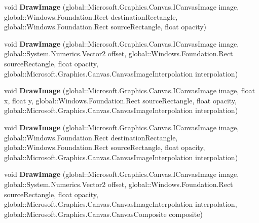 \begin{DoxyCompactItemize}
\item 
\mbox{\label{interface_microsoft_1_1_graphics_1_1_canvas_1_1_i_canvas_drawing_session_aa765d0fa935b76101e503c6434376586}} 
void {\bfseries Draw\+Image} (global\+::\+Microsoft.\+Graphics.\+Canvas.\+I\+Canvas\+Image image, global\+::\+Windows.\+Foundation.\+Rect destination\+Rectangle, global\+::\+Windows.\+Foundation.\+Rect source\+Rectangle, float opacity)
\item 
\mbox{\label{interface_microsoft_1_1_graphics_1_1_canvas_1_1_i_canvas_drawing_session_a9e068a61002b3491bc70ea21e2ee8517}} 
void {\bfseries Draw\+Image} (global\+::\+Microsoft.\+Graphics.\+Canvas.\+I\+Canvas\+Image image, global\+::\+System.\+Numerics.\+Vector2 offset, global\+::\+Windows.\+Foundation.\+Rect source\+Rectangle, float opacity, global\+::\+Microsoft.\+Graphics.\+Canvas.\+Canvas\+Image\+Interpolation interpolation)
\item 
\mbox{\label{interface_microsoft_1_1_graphics_1_1_canvas_1_1_i_canvas_drawing_session_aa7b11bec4901a474249edf660e7decd5}} 
void {\bfseries Draw\+Image} (global\+::\+Microsoft.\+Graphics.\+Canvas.\+I\+Canvas\+Image image, float x, float y, global\+::\+Windows.\+Foundation.\+Rect source\+Rectangle, float opacity, global\+::\+Microsoft.\+Graphics.\+Canvas.\+Canvas\+Image\+Interpolation interpolation)
\item 
\mbox{\label{interface_microsoft_1_1_graphics_1_1_canvas_1_1_i_canvas_drawing_session_a95fe7324d80e934f84faf2e041b53f43}} 
void {\bfseries Draw\+Image} (global\+::\+Microsoft.\+Graphics.\+Canvas.\+I\+Canvas\+Image image, global\+::\+Windows.\+Foundation.\+Rect destination\+Rectangle, global\+::\+Windows.\+Foundation.\+Rect source\+Rectangle, float opacity, global\+::\+Microsoft.\+Graphics.\+Canvas.\+Canvas\+Image\+Interpolation interpolation)
\item 
\mbox{\label{interface_microsoft_1_1_graphics_1_1_canvas_1_1_i_canvas_drawing_session_a8b677c4de87ab3a0d18e8a4e7904562e}} 
void {\bfseries Draw\+Image} (global\+::\+Microsoft.\+Graphics.\+Canvas.\+I\+Canvas\+Image image, global\+::\+System.\+Numerics.\+Vector2 offset, global\+::\+Windows.\+Foundation.\+Rect source\+Rectangle, float opacity, global\+::\+Microsoft.\+Graphics.\+Canvas.\+Canvas\+Image\+Interpolation interpolation, global\+::\+Microsoft.\+Graphics.\+Canvas.\+Canvas\+Composite composite)

\end{DoxyCompactItemize}
